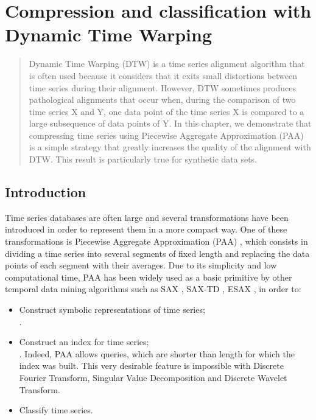 \chapter[Preprocessing of time series]{Compression and classification with Dynamic Time Warping}
\label{fdtw}

\begin{abstract}
 Dynamic Time Warping (DTW) is a time series alignment algorithm that is often used because it
 considers that it exits small distortions between time series during their alignment.  However, DTW
 sometimes produces pathological alignments that occur when, during the comparison of two time series
 X and Y, one data point of the time series X is compared to a large subsequence of data points of Y.
 In this chapter, we demonstrate that  compressing time series using Piecewise Aggregate Approximation
 (PAA) is a simple strategy that greatly increases the quality of the alignment with DTW. This result is 
 particularly true for synthetic data sets.      
 \end{abstract}

\section{Introduction}
%


Time series databases are often large and several transformations have been
introduced in order to represent them in a more compact way. One of these transformations is
Piecewise Aggregate Approximation (PAA) \cite{keogh2001dimensionality}, which consists in dividing a
time series into several segments of fixed length and replacing the data points of each segment with
their averages. Due to its simplicity and low computational time, PAA has been widely used as a
basic primitive by other temporal data mining algorithms such as SAX \cite{lin2003symbolic}, SAX-TD \cite{sun2014improvement}, ESAX  \cite{lkhagva2006extended}, in order to: 
\begin{itemize}
  \item Construct symbolic representations of time
series; \cite{camerra2010isax} \\ \cite{ulanova2015scalable}.
  \item Construct an index for time series; \cite{zhao2016shapedtw} \\ \cite{keogh2000scaling}  \cite{Kate2016}. Indeed, PAA allows queries, which are shorter than length for which the
index was built. This very desirable feature is impossible with Discrete Fourier Transform, Singular
Value Decomposition and Discrete Wavelet Transform.
\item Classify time series.
\end{itemize}


